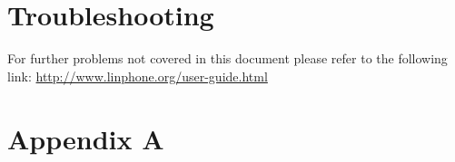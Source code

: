 \documentclass[11pt]{article}
\begin{document}


\section{Troubleshooting}

For further problems not covered in this document please refer to the following link:
\url{http://www.linphone.org/user-guide.html}


\section{Appendix A}
\listoffigures
\end{document}
